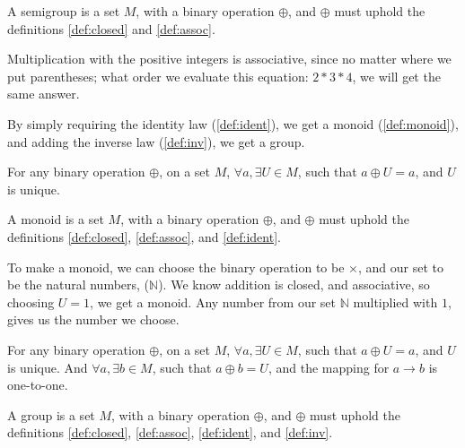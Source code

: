 \begin{definition}[Semigroup] \label{def:semi}
  A semigroup is a set $M$, with a binary operation $\oplus$, and $\oplus$ must
  uphold the definitions \ref{def:closed} and \ref{def:assoc}.
\end{definition}

\begin{exmp}
  Multiplication with the positive integers is associative, since no matter
  where we put parentheses; what order we evaluate this equation: $2 * 3 * 4$,
  we will get the same answer.
\end{exmp}

By simply requiring the identity law (\ref{def:ident}), we get a
monoid (\ref{def:monoid}), and adding the inverse law
(\ref{def:inv}), we get a group.

\begin{definition} \label{def:ident}
  For any binary operation $\oplus$, on a set $M$,
  $\forall a, \exists U \in M$, such that
  $a \oplus U = a$, and $U$ is unique.
\end{definition}

\begin{definition}[Monoid] \label{def:monoid}
  A monoid is a set $M$, with a binary operation $\oplus$, and $\oplus$ must
  uphold the definitions \ref{def:closed}, \ref{def:assoc}, and \ref{def:ident}.
\end{definition}

\begin{exmp}
  To make a monoid, we can choose the binary operation to be $\times$, and our
  set to be the natural numbers, ($\mathbb{N}$). We know addition is closed, and
  associative, so choosing $U = 1$, we get a monoid. Any number from our set
  $\mathbb{N}$ multiplied with $1$, gives us the number we choose.
\end{exmp}

\begin{definition} \label{def:inv}
  For any binary operation $\oplus$, on a set $M$,
  $\forall a, \exists U \in M$, such that
  $a \oplus U = a$, and $U$ is unique.
  And $\forall a, \exists b \in M$, such that $a \oplus b = U$, and the mapping
  for $a \to b$ is one-to-one.
\end{definition}

\begin{definition}[Group] \label{def:group}
  A group is a set $M$, with a binary operation $\oplus$, and $\oplus$ must
  uphold the definitions \ref{def:closed}, \ref{def:assoc}, \ref{def:ident},
  and \ref{def:inv}.
\end{definition}

